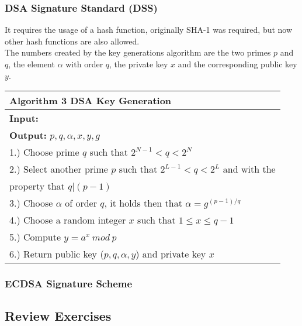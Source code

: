 \documentclass[a4paper, 10 pt, conference]{ieeeconf}
\begin{document}
\subsubsection{\textbf{DSA Signature Standard (DSS)}}
It requires the usage of a hash function, originally SHA-1 was required, but now other hash functions are also allowed. \\
The numbers created by the key generations algorithm are the two primes $p$ and $q$, the element $\alpha$ with order $q$, the private key $x$ and the corresponding public key $y$.
\begin{table}[h!]
  \begin{center}
    \begin{tabular}{ l   }
    \toprule
    \textbf{Algorithm 3} DSA Key Generation \\ \midrule
    \textbf{Input:}  \\ 
    \textbf{Output:} $p,q,\alpha,x,y,g$ \\
    1.) Choose prime $q$ such that $2^{N-1} < q < 2^{N}$ \\
    2.) Select another prime $p$ such that $2^{L-1} < q < 2^{L}$ and with the \\
    property that $q|(p-1)$ \\
    3.) Choose $\alpha$ of order $q$, it holds then that $\alpha = g^{(p-1)/q}$ \\
    4.) Choose a random integer $x$ such that $1 \leq x \leq q-1$ \\
    5.) Compute $y = a^{x} \ mod \ p$ \\
    6.) Return public key ($p,q,\alpha,y$) and private key $x$\\
    \bottomrule
    \end{tabular}
  \end{center}
\end{table}



\vspace{0.5cm}
\subsubsection{\textbf{ECDSA Signature Scheme}}


\subsection{\textbf{Review Exercises}}
\end{document}
